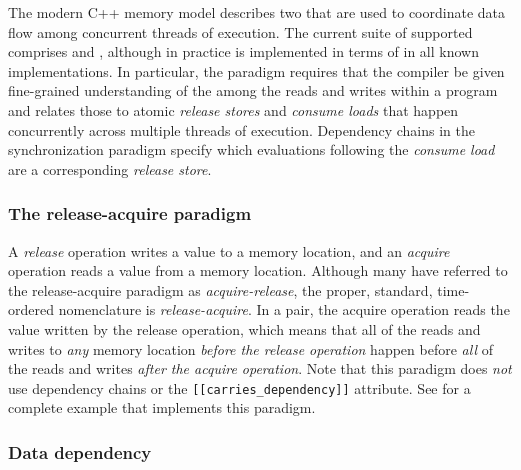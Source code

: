 The modern C++ memory model describes two  that are used
to coordinate data flow among concurrent threads of execution. The current suite of supported
 comprises  and , although in practice
 is implemented in terms of  in all known implementations. In
particular, the  paradigm requires that the
compiler be given fine-grained understanding of the  among the reads and writes within a program
and relates those to atomic \emph{release stores} and \emph{consume
loads} that happen concurrently across multiple threads of execution.
Dependency chains in the  synchronization
paradigm specify which evaluations following the \emph{consume load} are
 a corresponding \emph{release store}.

\subsubsection[The release-acquire paradigm]{The release-acquire paradigm}\label{the-release-acquire-paradigm}

A \emph{release} operation writes a value to a memory location, and an
\emph{acquire} operation reads a value from a memory location. Although many have
referred to the release-acquire paradigm as \emph{acquire-release}, the proper, standard,
  time-ordered nomenclature is \emph{release-acquire}. In a  pair, the acquire operation reads the value written by
the release operation, which means that all of the reads and writes to
\emph{any} memory location \emph{before the release operation} happen
before \emph{all} of the reads and writes \emph{after the acquire operation}. Note that this paradigm does \emph{not} use
dependency chains or the \lstinline![[carries_dependency]]! attribute. See 
for a
complete example that implements this paradigm.

\subsubsection[Data dependency]{Data dependency}\label{data-dependency}

